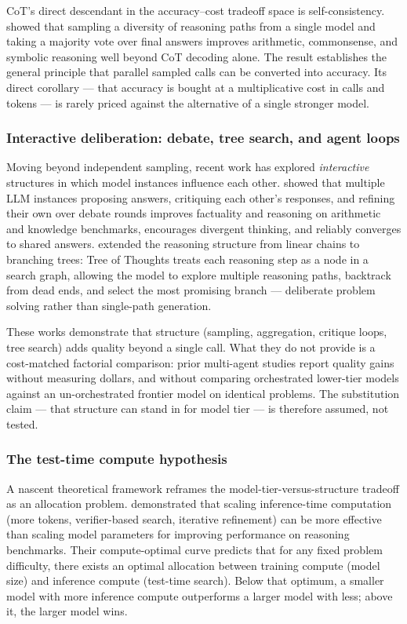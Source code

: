 \documentclass[12pt,a4paper]{article}
\begin{document}
CoT's direct descendant in the accuracy--cost tradeoff space is
self-consistency. \citet{WangEtAl2023} showed that sampling a diversity of
reasoning paths from a single model and taking a majority vote over final
answers improves arithmetic, commonsense, and symbolic reasoning well beyond
CoT decoding alone. The result establishes the general principle that parallel
sampled calls can be converted into accuracy. Its direct corollary --- that
accuracy is bought at a multiplicative cost in calls and tokens --- is rarely
priced against the alternative of a single stronger model.

\subsubsection{Interactive deliberation: debate, tree search, and agent loops}

Moving beyond independent sampling, recent work has explored \emph{interactive}
structures in which model instances influence each other. \citet{LiangEtAl2024}
showed that multiple LLM instances proposing answers, critiquing each other's
responses, and refining their own over debate rounds improves factuality and
reasoning on arithmetic and knowledge benchmarks, encourages divergent
thinking, and reliably converges to shared answers. \citet{YaoEtAl2023} extended
the reasoning structure from linear chains to branching trees: Tree of Thoughts
treats each reasoning step as a node in a search graph, allowing the model to
explore multiple reasoning paths, backtrack from dead ends, and select the most
promising branch --- deliberate problem solving rather than single-path
generation.

These works demonstrate that structure (sampling, aggregation, critique loops,
tree search) adds quality beyond a single call. What they do not provide is a
cost-matched factorial comparison: prior multi-agent studies report quality
gains without measuring dollars, and without comparing orchestrated lower-tier models
against an un-orchestrated frontier model on identical problems. The
substitution claim --- that structure can stand in for model tier --- is
therefore assumed, not tested.

\subsubsection{The test-time compute hypothesis}

A nascent theoretical framework reframes the model-tier-versus-structure
tradeoff as an allocation problem. \citet{SnellEtAl2024} demonstrated that
scaling inference-time computation (more tokens, verifier-based search,
iterative refinement) can be more effective than scaling model parameters for
improving performance on reasoning benchmarks. Their compute-optimal curve
predicts that for any fixed problem difficulty, there exists an optimal
allocation between training compute (model size) and inference compute
(test-time search). Below that optimum, a smaller model with more inference
compute outperforms a larger model with less; above it, the larger model wins.
\end{document}
